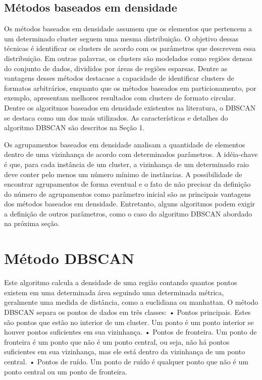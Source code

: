 \subsection{Métodos baseados em densidade}
Os métodos baseados em densidade assumem que os elementos que pertencem a
um determinado cluster seguem uma mesma distribuição. O objetivo dessas técnicas é
identificar os clusters de acordo com os parâmetros que descrevem essa distribuição. Em
outras palavras, os clusters são modelados como regiões densas do conjunto de dados,
divididos por áreas de regiões esparsas. Dentre as vantagens desses métodos destacase
a capacidade de identificar clusters de formatos arbitrários, enquanto que os métodos
baseados em particionamento, por exemplo, apresentam melhores resultados com clusters
de formato circular.
Dentre os algoritmos baseados em densidade existentes na literatura, o DBSCAN se destaca
como um dos mais utilizados. As características e detalhes do algoritmo DBSCAN
são descritos na Seção 1.


Os agrupamentos baseados em densidade analisam a quantidade de elementos dentro de uma vizinhança de acordo com determinados parâmetros. A idéia-chave é que, para cada instância de um cluster, a vizinhança de um determinado raio deve conter pelo menos um número mínimo de instâncias.
A possibilidade de encontrar agrupamentos de forma eventual e o fato de não precisar da definição do número de agrupamentos \cite{yip2005} como parâmetro inicial são as principais vantagens dos métodos baseados em densidade. Entretanto, alguns algoritmos podem exigir a definição de outros parâmetros, como o caso do algoritmo DBSCAN \cite{density-based-clusters} abordado na próxima seção.

\section{Método DBSCAN}
\label{dbscan}

Este algoritmo calcula a densidade de uma região contando quantos pontos existem em uma determinada área seguindo uma determinada métrica, geralmente uma medida de distância, como a euclidiana ou manhattan. O método DBSCAN separa os pontos de dados em três classes:
• Pontos principais. Estes são pontos que estão no interior de um cluster. Um ponto é um ponto interior se houver pontos suficientes em sua vizinhança.
• Pontos de fronteira. Um ponto de fronteira é um ponto que não é um ponto central, ou seja, não há pontos suficientes em sua vizinhança, mas ele está dentro da vizinhança de um ponto central.
• Pontos de ruído. Um ponto de ruído é qualquer ponto que não é um ponto central ou um ponto de fronteira.

